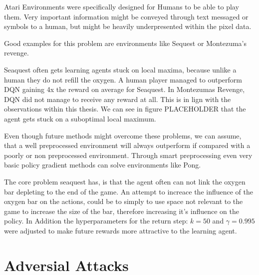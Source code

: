 Atari Environments were specifically designed for Humans to be able to play them. Very important information might be conveyed through text messaged or symbols to a human, but might be heavily underpresented within the pixel data.

Good examples for this problem are environments like Sequest or Montezuma's revenge. 

Seaquest often gets learning agents stuck on local maxima, because unlike a human they do not refill the oxygen.
A human player managed to outperform DQN \citep{nature} gaining 4x the reward on average for Seaquest. In Montezumas Revenge, DQN did not manage to receive any reward at all.
This is in lign with the observations within this thesis. We can see in  figure PLACEHOLDER that the agent gets stuck on a suboptimal local maximum. 

Even though future methods might overcome these problems, we can assume, that a well preprocessed environment will always outperform if compared with a poorly or non preprocessed environment.
Through smart preprocessing even very basic policy gradient methods can solve environments like Pong.  \citep{karpathy}

The core problem seaquest has, is that the agent often can not link the oxygen bar depleting to the end of the game. 
An attempt to increace the influence of the oxygen bar on the actions, could be to simply to use space not relevant to the game to increase the size of the bar, therefore increasing it's influence on the policy.
In Addition the hyperparameters for the return step: $k=50$ and $\gamma =0.995$ were adjusted to make future rewards more attractive to the learning agent.



\section{Adversial Attacks}

